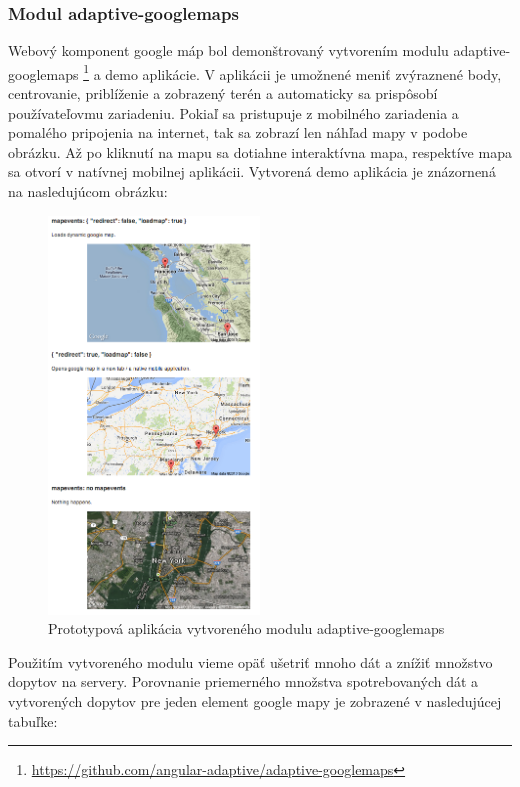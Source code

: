 
\subsubsection{Modul adaptive-googlemaps} %
\label{sub:adaptive_googlemaps}

Webový komponent google máp bol demonštrovaný vytvorením modulu adaptive-googlemaps \footnote{\url{https://github.com/angular-adaptive/adaptive-googlemaps}} a demo aplikácie. V aplikácii je umožnené meniť zvýraznené body, centrovanie, priblíženie a zobrazený terén a automaticky sa prispôsobí používateľovmu zariadeniu. Pokiaľ sa pristupuje z mobilného zariadenia a pomalého pripojenia na internet, tak sa zobrazí len náhľad mapy v podobe obrázku. Až po kliknutí na mapu sa dotiahne interaktívna mapa, respektíve mapa sa otvorí v natívnej mobilnej aplikácii. Vytvorená demo aplikácia je znázornená na nasledujúcom obrázku:

\newpage
\begin{figure}[H]
  \centering
  \includegraphics[width=0.5\textwidth]{img/adaptivegooglemaps.png}
  \caption[Prototypová aplikácia vytvoreného modulu adaptive-googlemaps]{
    Prototypová aplikácia vytvoreného modulu adaptive-googlemaps}
  \label{fig: adaptivemotion}
\end{figure}

Použitím vytvoreného modulu vieme opäť ušetriť mnoho dát a znížiť množstvo dopytov na servery. Porovnanie priemerného množstva spotrebovaných dát a vytvorených dopytov pre jeden element google mapy je zobrazené v nasledujúcej tabuľke:


